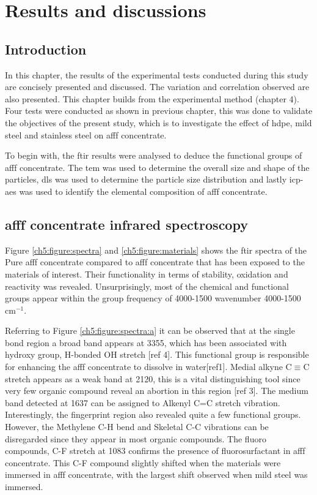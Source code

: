 \chapter{Results and discussions}
\section{Introduction}
In this chapter, the results of the experimental tests conducted during this study are concisely presented and discussed. The variation and correlation observed are also presented. This chapter builds from the experimental method (chapter 4).  Four tests were conducted as shown in previous chapter, this was done to validate the objectives of the present study, which is to investigate the effect of \acrshort{hdpe}, mild steel and stainless steel on \acrshort{afff} concentrate. 

To begin with, the \acrshort{ftir} results were analysed to deduce the functional groups of \acrshort{afff} concentrate. The \acrshort{tem} was used to determine the overall size and shape of the particles, \acrshort{dls} was used to determine the particle size distribution and lastly \acrshort{icp-aes} was used to identify the elemental composition of \acrshort{afff} concentrate.  

\section{\acrshort{afff} concentrate infrared spectroscopy}
Figure \ref{ch5:figure:spectra} and \ref{ch5:figure:materials} shows the \acrshort{ftir} spectra of the Pure \acrshort{afff} concentrate compared to \acrshort{afff} concentrate that has been exposed to the materials of interest.  Their functionality in terms of stability, oxidation and reactivity was revealed. Unsurprisingly, most of the chemical and functional groups appear within the group frequency of 4000-1500 wavenumber 4000-1500 cm$^{-1}$.

Referring to Figure \ref{ch5:figure:spectra:a} it can be observed that at the single bond region a broad band appears at 3355, which has been associated with hydroxy group, H-bonded OH stretch [ref 4]. This functional group is responsible for enhancing the \acrshort{afff} concentrate to dissolve in water[ref1].  Medial alkyne C$\equiv$C stretch appears as a weak band at 2120, this is a vital distinguishing tool since very few organic compound reveal an abortion in this region [ref 3]. The medium band detected at 1637 can be assigned to Alkenyl C=C stretch vibration. Interestingly, the fingerprint region also revealed quite a few functional groups. However, the Methylene C-H bend and Skeletal C-C vibrations can be disregarded since they appear in most organic compounds. The fluoro compounds, C-F stretch at 1083 confirms the presence of fluorosurfactant in \acrshort{afff} concentrate. This C-F compound slightly shifted when the materials were immersed in \acrshort{afff} concentrate, with the largest shift observed when mild steel was immersed.

